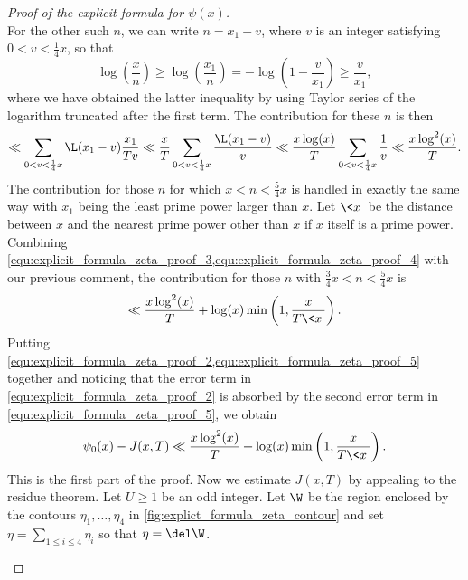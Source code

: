 \begin{proof}[Proof of the explicit formula for $\psi(x)$]
\begin{equation}
      \end{equation}
      For the other such $n$, we can write $n = x_{1}-v$, where $v$ is an integer satisfying $0 < v < \frac{1}{4}x$, so that
      \[
        \log\left(\frac{x}{n}\right) \ge \log\left(\frac{x_{1}}{n}\right) = -\log\left(1-\frac{v}{x_{1}}\right) \ge \frac{v}{x_{1}},
      \]
      where we have obtained the latter inequality by using Taylor series of the logarithm truncated after the first term. The contribution for these $n$ is then
      \begin{equation}\label{equ:explicit_formula_zeta_proof_4}
        \ll \sum_{0 < v < \frac{1}{4}x}\L(x_{1}-v)\frac{x_{1}}{Tv} \ll \frac{x}{T}\sum_{0 < v < \frac{1}{4}x}\frac{\L(x_{1}-v)}{v} \ll \frac{x\log(x)}{T}\sum_{0 < v < \frac{1}{4}x}\frac{1}{v} \ll \frac{x\log^{2}(x)}{T}.
      \end{equation}
      The contribution for those $n$ for which $x < n < \frac{5}{4}x$ is handled in exactly the same way with $x_{1}$ being the least prime power larger than $x$. Let $\<x\>$ be the distance between $x$ and the nearest prime power other than $x$ if $x$ itself is a prime power. Combining \cref{equ:explicit_formula_zeta_proof_3,equ:explicit_formula_zeta_proof_4} with our previous comment, the contribution for those $n$ with $\frac{3}{4}x < n < \frac{5}{4}x$ is
      \begin{equation}\label{equ:explicit_formula_zeta_proof_5}
        \ll \frac{x\log^{2}(x)}{T}+\log(x)\min\left(1,\frac{x}{T\<x\>}\right).
      \end{equation}
      Putting \cref{equ:explicit_formula_zeta_proof_2,equ:explicit_formula_zeta_proof_5} together and noticing that the error term in \cref{equ:explicit_formula_zeta_proof_2} is absorbed by the second error term in \cref{equ:explicit_formula_zeta_proof_5}, we obtain
      \begin{equation}\label{equ:explicit_formula_zeta_proof_6}
        \psi_{0}(x)-J(x,T) \ll \frac{x\log^{2}(x)}{T}+\log(x)\min\left(1,\frac{x}{T\<x\>}\right).
      \end{equation}
      This is the first part of the proof. Now we estimate $J(x,T)$ by appealing to the residue theorem. Let $U \ge 1$ be an odd integer. Let $\W$ be the region enclosed by the contours $\eta_{1},\ldots,\eta_{4}$ in \cref{fig:explict_formula_zeta_contour} and set $\eta = \sum_{1 \le i \le 4}\eta_{i}$ so that $\eta = \del \W$.

      \begin{figure}[ht]
        \centering
\end{figure}
\end{proof}
